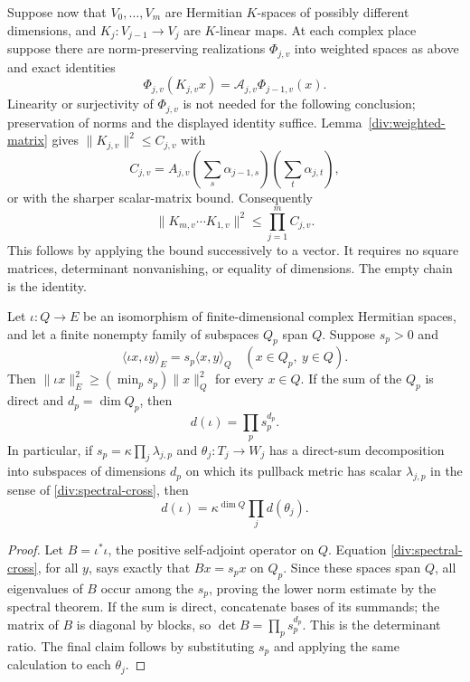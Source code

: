 Suppose now that $V_0,\ldots,V_m$ are Hermitian $K$-spaces of possibly
different dimensions, and $K_j:V_{j-1}\to V_j$ are $K$-linear maps.
At each complex place suppose there are norm-preserving realizations
$\Phi_{j,v}$ into weighted spaces as above and exact identities
\[
 \Phi_{j,v}(K_{j,v}x)=\mathcal A_{j,v}\Phi_{j-1,v}(x).
\]
Linearity or surjectivity of $\Phi_{j,v}$ is not needed for the following
conclusion; preservation of norms and the displayed identity suffice.
Lemma~\ref{div:weighted-matrix} gives $\|K_{j,v}\|^2\le C_{j,v}$ with
\[
 C_{j,v}=A_{j,v}\left(\sum_s\alpha_{j-1,s}\right)
                          \left(\sum_t\alpha_{j,t}\right),
\]
or with the sharper scalar-matrix bound. Consequently
\begin{equation}\label{div:chain}
 \|K_{m,v}\cdots K_{1,v}\|^2\le\prod_{j=1}^m C_{j,v}.
\end{equation}
This follows by applying the bound successively to a vector. It requires
no square matrices, determinant nonvanishing, or equality of dimensions.
The empty chain is the identity.

\begin{lemma}\label{div:spectral}
Let $\iota:Q\to E$ be an isomorphism of finite-dimensional complex
Hermitian spaces, and let a finite nonempty family of subspaces $Q_p$
span $Q$. Suppose
$s_p>0$ and
\begin{equation}\label{div:spectral-cross}
 \langle\iota x,\iota y\rangle_E
       =s_p\langle x,y\rangle_Q
             \quad(x\in Q_p,\ y\in Q).
\end{equation}
Then
$\|\iota x\|_E^2\ge(\min_ps_p)\|x\|_Q^2$ for every $x\in Q$.
If the sum of the $Q_p$ is direct and $d_p=\dim Q_p$, then
\[
 d(\iota)=\prod_ps_p^{d_p}.
\]
In particular, if $s_p=\kappa\prod_j\lambda_{j,p}$ and
$\theta_j:T_j\to W_j$ has a direct-sum decomposition into subspaces
of dimensions $d_p$ on which its pullback metric has scalar
$\lambda_{j,p}$ in the sense of \eqref{div:spectral-cross}, then
\[
 d(\iota)=\kappa^{\dim Q}\prod_jd(\theta_j).
\]
\end{lemma}
\begin{proof}
Let $B=\iota^*\iota$, the positive self-adjoint operator on $Q$.
Equation \eqref{div:spectral-cross}, for all $y$, says exactly that
$Bx=s_px$ on $Q_p$. Since these spaces span $Q$, all eigenvalues of
$B$ occur among the $s_p$, proving the lower norm estimate by the
spectral theorem. If the sum is direct, concatenate bases of its
summands; the matrix of $B$ is diagonal by blocks, so
$\det B=\prod_ps_p^{d_p}$. This is the determinant ratio. The final
claim follows by substituting $s_p$ and applying the same calculation
to each $\theta_j$.
\end{proof}

